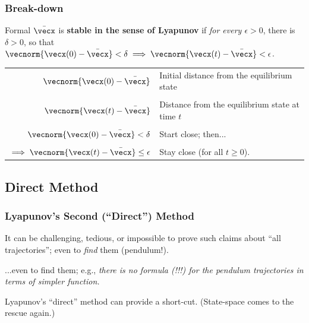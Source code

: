 \documentclass[12pt]{beamer}
\begin{document}
\begin{frame}
\frametitle{Break-down}

\begin{block}{Formal}
$\bar\vecx$ is \textbf{stable in the sense of Lyapunov} if
\emph{for every $\epsilon > 0$}, there is $\delta >0$, so that
$\vecnorm{\vecx(0)-\bar\vecx} < \delta
 \implies \vecnorm{\vecx(t) - \bar\vecx} < \epsilon$. 
\end{block}

\begin{tabular}{rp{.6\linewidth}}
$\vecnorm{\vecx(0)-\bar\vecx}$
	& Initial distance from the equilibrium state \\ \\
	
$\vecnorm{\vecx(t)-\bar\vecx}$
	& Distance from the equilibrium state at time $t$ \\ \\
	
$\vecnorm{\vecx(0)-\bar\vecx} < \delta$
	& Start close; then... \\ \\

$\implies \vecnorm{\vecx(t)-\bar\vecx} \leq \epsilon$
	& Stay close (for all $t \geq 0$). \\

\end{tabular}

\vfill\null

\end{frame}






\subsection{Direct Method}

\begin{frame}
\frametitle{Lyapunov's Second (``Direct'') Method}

\begin{itemize}
\vitem
It can be challenging, tedious, or impossible
to prove such claims about ``all trajectories'';
even to \emph{find} them (pendulum!).

\vitem
...even to find them; e.g., 
\emph{there is no formula (!!!) for the pendulum trajectories in terms of simpler function.}

\vitem
Lyapunov's ``direct'' method can provide a short-cut.
(State-space comes to the rescue again.)

\end{itemize}

\vfill\null
\end{frame}
\end{document}

